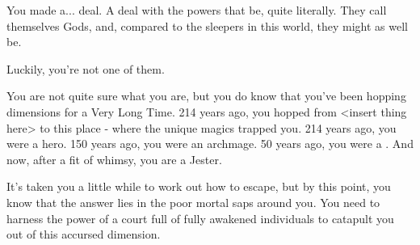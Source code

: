 \documentclass[char]{Emperia}
\begin{document}
\name{\cJester{}}

You made a... deal. A deal with the powers that be, quite literally. They call themselves Gods, and, compared to the sleepers in this world, they might as well be. 

Luckily, you're not one of them.

You are not quite sure what you are, but you do know that you've been hopping dimensions for a Very Long Time. 214 years ago, you hopped from <insert thing here> to this place - where the unique magics trapped you. 214 years ago, you were a hero. 150 years ago, you were an archmage. 50 years ago, you were a \monarch{}. And now, after a fit of whimsy, you are a Jester. 

It's taken you a little while to work out how to escape, but by this point, you know that the answer lies in the poor mortal saps around you. You need to harness the power of a court full of fully awakened individuals to catapult you out of this accursed dimension.
\end{document}
